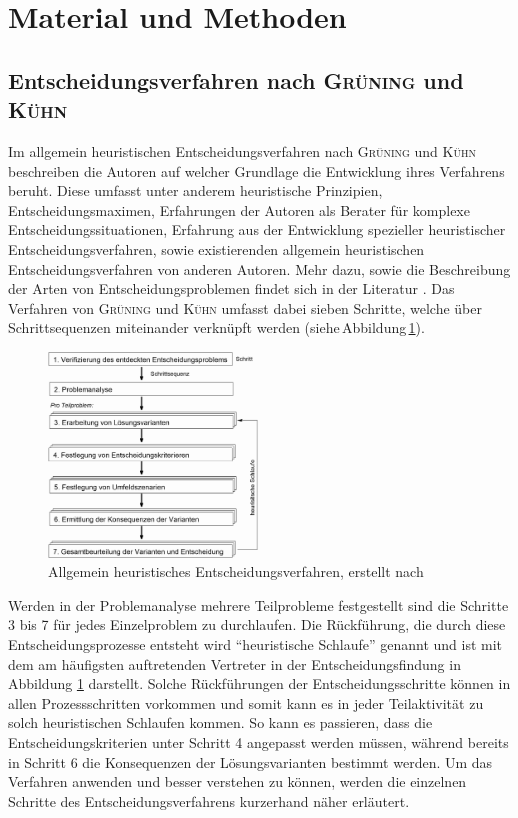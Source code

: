 \newpage
\section{Material und Methoden}
\label{sec:durchführung}
\subsection{Entscheidungsverfahren nach \textsc{Grüning} und \textsc{Kühn}}

Im allgemein heuristischen Entscheidungsverfahren nach \textsc{Grüning} und \textsc{Kühn} beschreiben die Autoren auf welcher Grundlage die Entwicklung ihres Verfahrens beruht. Diese umfasst unter anderem heuristische Prinzipien, Entscheidungsmaximen, Erfahrungen der Autoren als Berater für komplexe Entscheidungssituationen, Erfahrung aus der Entwicklung spezieller heuristischer Entscheidungsverfahren, sowie existierenden allgemein heuristischen Entscheidungsverfahren von anderen Autoren. Mehr dazu, sowie die Beschreibung der Arten von Entscheidungsproblemen findet sich in der Literatur \cite{Grunig.2013}. Das Verfahren von \textsc{Grüning} und \textsc{Kühn} umfasst dabei sieben Schritte, welche über Schrittsequenzen miteinander verknüpft werden (siehe\,Abbildung\,\ref{fig:ahev}).  

\begin{figure}[h!]
	\centering
	\includegraphics[width=0.5\textwidth]{img/heuristik}
	\caption{Allgemein heuristisches Entscheidungsverfahren, erstellt nach \cite{Grunig.2013}}
	\label{fig:ahev}
\end{figure}
\FloatBarrier

Werden in der Problemanalyse mehrere Teilprobleme festgestellt sind die Schritte\,3 bis 7 für jedes Einzelproblem zu durchlaufen. Die Rückführung, die durch diese Entscheidungsprozesse entsteht wird "`heuristische Schlaufe"' genannt und ist mit dem am häufigsten auftretenden Vertreter in der Entscheidungsfindung in Abbildung \ref{fig:ahev} darstellt. Solche Rückführungen der Entscheidungsschritte können in allen Prozessschritten vorkommen und somit kann es in jeder Teilaktivität zu solch heuristischen Schlaufen kommen. So kann es passieren, dass die Entscheidungskriterien unter Schritt 4 angepasst werden müssen, während bereits in Schritt 6 die Konsequenzen der Lösungsvarianten bestimmt werden. Um das Verfahren anwenden und besser verstehen zu können, werden die einzelnen Schritte des Entscheidungsverfahrens kurzerhand näher erläutert. 
\vspace*{-2.5mm}
